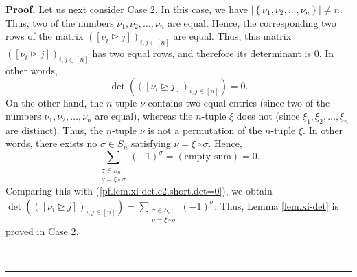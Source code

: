 \documentclass[numbers=enddot,12pt,final,onecolumn,notitlepage,english]{scrartcl}%
\theoremstyle{definition}
\newenvironment{proof}[1][Proof]{\noindent\textbf{#1.} }{\ \rule{0.5em}{0.5em}}
\let\sumnonlimits\sum
\renewcommand{\sum}{\sumnonlimits\limits}
\newenvironment{vershort}{}{}
\begin{document}
\begin{proof}
\begin{vershort}
Let us next consider Case 2. In this case, we have $\left\vert \left\{
\nu_{1},\nu_{2},\ldots,\nu_{n}\right\}  \right\vert \neq n$. Thus, two of the
numbers $\nu_{1},\nu_{2},\ldots,\nu_{n}$ are equal. Hence, the corresponding
two rows of the matrix $\left(  \left[  \nu_{i}\trianglerighteq j\right]
\right)  _{i,j\in\left[  n\right]  }$ are equal. Thus, this matrix $\left(
\left[  \nu_{i}\trianglerighteq j\right]  \right)  _{i,j\in\left[  n\right]
}$ has two equal rows, and therefore its determinant is $0$. In other words,
\begin{equation}
\det\left(  \left(  \left[  \nu_{i}\trianglerighteq j\right]  \right)
_{i,j\in\left[  n\right]  }\right)  =0. \label{pf.lem.xi-det.c2.short.det=0}%
\end{equation}
On the other hand, the $n$-tuple $\nu$ contains two equal entries (since two
of the numbers $\nu_{1},\nu_{2},\ldots,\nu_{n}$ are equal), whereas the
$n$-tuple $\xi$ does not (since $\xi_{1},\xi_{2},\ldots,\xi_{n}$ are
distinct). Thus, the $n$-tuple $\nu$ is not a permutation of the $n$-tuple
$\xi$. In other words, there exists no $\sigma\in S_{n}$ satisfying $\nu
=\xi\circ\sigma$. Hence,%
\[
\sum_{\substack{\sigma\in S_{n};\\\nu=\xi\circ\sigma}}\left(  -1\right)
^{\sigma}=\left(  \text{empty sum}\right)  =0.
\]
Comparing this with (\ref{pf.lem.xi-det.c2.short.det=0}), we obtain
$\det\left(  \left(  \left[  \nu_{i}\trianglerighteq j\right]  \right)
_{i,j\in\left[  n\right]  }\right)  =\sum_{\substack{\sigma\in S_{n};\\\nu
=\xi\circ\sigma}}\left(  -1\right)  ^{\sigma}$. Thus, Lemma \ref{lem.xi-det}
is proved in Case 2. \medskip
\end{vershort}


\end{proof}
\end{document}
